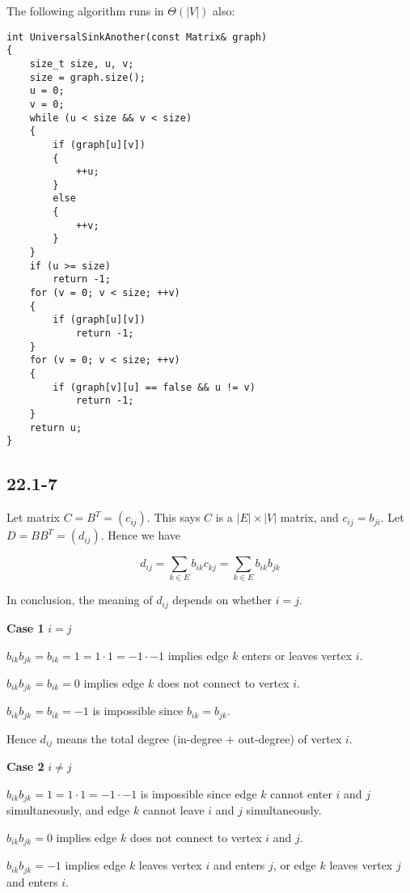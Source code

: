 The following algorithm runs in $\Theta(|V|)$ also:

\begin{verbatim}
int UniversalSinkAnother(const Matrix& graph)
{
    size_t size, u, v;
    size = graph.size();
    u = 0;
    v = 0;
    while (u < size && v < size)
    {
        if (graph[u][v])
        {
            ++u;
        }
        else
        {
            ++v;
        }
    }
    if (u >= size)
        return -1;
    for (v = 0; v < size; ++v)
    {
        if (graph[u][v])
            return -1;
    }
    for (v = 0; v < size; ++v)
    {
        if (graph[v][u] == false && u != v)
            return -1;
    }
    return u;
}
\end{verbatim}

\subsection*{22.1-7}

Let matrix $C = B^T = (c_{ij})$.
This says $C$ is a $|E| \times |V|$ matrix,
and $c_{ij} = b_{ji}$.
Let $D = BB^T = (d_{ij})$.
Hence we have

\begin{equation*}
    d_{ij} = \sum\limits_{k \in E} b_{ik} c_{kj} = \sum\limits_{k \in E} b_{ik} b_{jk}
\end{equation*}

In conclusion, the meaning of $d_{ij}$ depends on whether $i=j$.

\textbf{Case 1}
$i = j$

$b_{ik}b_{jk} = b_{ik} = 1 = 1 \cdot 1 = -1 \cdot -1$ implies edge $k$ enters or leaves vertex $i$. 

$b_{ik}b_{jk} = b_{ik} = 0$ implies edge $k$ does not connect to vertex $i$. 

$b_{ik}b_{jk} = b_{ik} = -1$ is impossible since $b_{ik} = b_{jk}$.

Hence $d_{ij}$ means the total degree (in-degree + out-degree) of vertex $i$.

\textbf{Case 2}
$i \neq j$

$b_{ik}b_{jk} = 1 = 1 \cdot 1 = -1 \cdot -1$ is impossible 
since edge $k$ cannot enter $i$ and $j$ simultaneously,
and edge $k$ cannot leave $i$ and $j$ simultaneously.

$b_{ik}b_{jk} = 0$ implies edge $k$ does not connect to vertex $i$ and $j$. 

$b_{ik}b_{jk} = -1$ implies edge $k$ leaves vertex $i$ and enters $j$,
or edge $k$ leaves vertex $j$ and enters $i$. 

